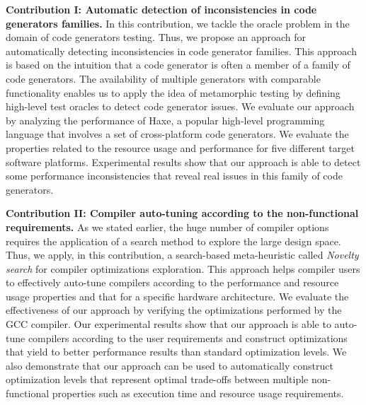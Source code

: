 \textbf{Contribution I: Automatic detection of inconsistencies in code generators families.}
In this contribution, we tackle the oracle problem in the domain of code generators testing. Thus, we propose an approach for automatically detecting inconsistencies in code generator families.
This approach is based on the intuition that a code generator is often a member of a family of code generators. The availability of multiple generators with comparable functionality enables us to apply the idea of metamorphic testing\cite{zhou2004metamorphic} by defining high-level test oracles to detect code generator issues.
We evaluate our approach by analyzing the performance of Haxe, a popular high-level programming language that involves a set of cross-platform code generators. We evaluate the properties related to the resource usage and performance for five different target software platforms. Experimental results show that our approach is able to detect some performance inconsistencies that reveal real issues in this family of code generators.

\textbf{Contribution II: Compiler auto-tuning according to the non-functional requirements.}
As we stated earlier, the huge number of compiler options requires the application of a search method to explore the large design space. Thus, we apply, in this contribution, a search-based meta-heuristic called \textit{Novelty search} for compiler optimizations exploration. This approach helps compiler users to effectively auto-tune compilers according to the performance and resource usage properties and that for a specific hardware architecture. 
We evaluate the effectiveness of our approach by verifying the optimizations performed by the GCC compiler.
Our experimental results show that our approach is able to auto-tune compilers according to the user requirements and construct optimizations that yield to better performance results than standard optimization levels. We also demonstrate that our approach can be used to automatically construct optimization levels that represent optimal trade-offs between multiple non-functional properties such as execution time and resource usage requirements.

